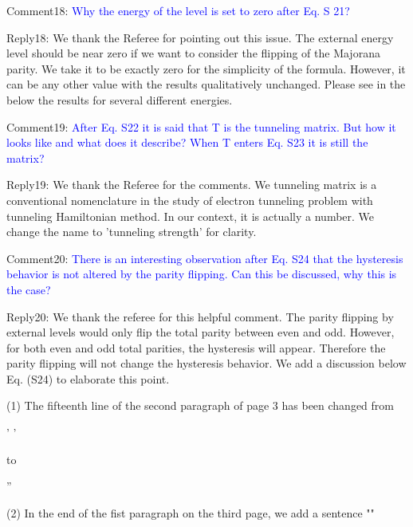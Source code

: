 \documentclass[onecolumn,preprintnumbers,amsmath,amssymb,prb]{revtex4}
\newcommand{\blue}[1]{\textcolor{blue}{#1}}
\begin{document}
\noindent Comment18:
\blue{Why the energy of the level is set to zero after Eq. S 21?}

\vspace{5mm}


\noindent Reply18: We thank the Referee for pointing out this issue. The external energy level should be near zero if we want to consider the flipping of the Majorana parity. We take it to be exactly zero for the simplicity of the formula. However, it can be any other value with the results qualitatively unchanged. Please see in the below the results for several different energies.

\vspace{5mm}
\noindent Comment19:
\blue{After Eq. S22 it is said that T is the tunneling matrix. But how it
looks like and what does it describe? When T enters Eq. S23 it is
still the matrix?}
\vspace{5mm}


\noindent Reply19: We thank the Referee for the comments. We tunneling matrix is a conventional nomenclature in the study of electron tunneling problem with tunneling Hamiltonian method. In our context, it is actually a number. We change the name to 'tunneling strength' for clarity.


\vspace{5mm}
\noindent Comment20:
\blue{There is an interesting observation after Eq. S24 that the hysteresis
behavior is not altered by the parity flipping. Can this be
discussed, why this is the case?}
\vspace{5mm}


\noindent Reply20: We thank the referee for this helpful comment. The parity flipping by external levels would only flip the total parity between even and odd. However, for both even and odd total parities, the hysteresis will appear. Therefore the parity flipping will not change the hysteresis behavior. We add a discussion below Eq. (S24) to elaborate this point.




\vspace{1cm}


(1)
The fifteenth line of the second paragraph of page 3 has been changed from

'
'

to

''

(2)
In the end of the fist paragraph on the third page, we add a sentence ""
\end{document}
